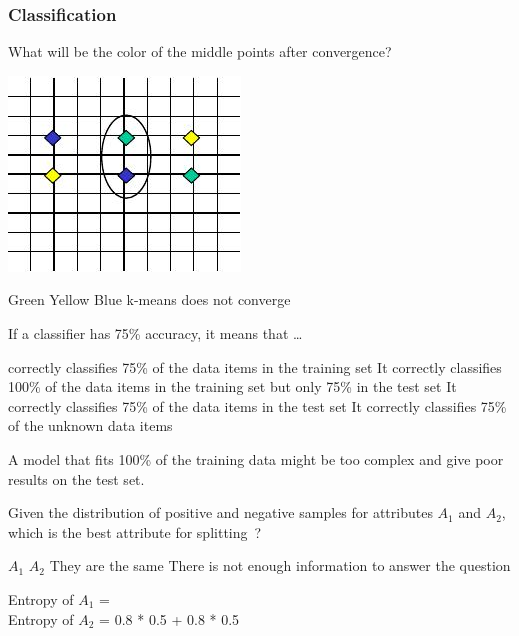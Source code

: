 \documentclass[12pt,a4paper,answers]{exam} %
\begin{document}
\begin{flushleft}
\begin{multicols*}{2}
\begin{questions}
\subsubsection{Classification}
% 
\question What will be the color of the middle points after convergence?
\begin{colfig}
\includegraphics[scale=0.3]{w11_s20}
\end{colfig}
\begin{checkboxes}
\choice Green
\choice Yellow
\choice Blue
\choice k-means does not converge
\end{checkboxes}

\question If a classifier has 75\% accuracy, it means that \ldots
\begin{checkboxes}
\choice correctly classifies 75\% of the data items in the training set
\choice It correctly classifies 100\% of the data items in the training set but only 75\% in the test set
\CorrectChoice It correctly classifies 75\% of the data items in the test set
\choice It correctly classifies 75\% of the unknown data items
\end{checkboxes}
\begin{solution}
A model that fits 100\% of the training data might be too complex and give poor results on the test set.
\end{solution}

\question Given the distribution of positive and negative samples for attributes $A_1$ and $A_2$, which is the best attribute for splitting~?
\begin{checkboxes}
\CorrectChoice $A_1$
\choice $A_2$
\choice They are the same
\choice There is not enough information to answer the question
\end{checkboxes}
\begin{solution}
Entropy of $A_1$ =  \\
Entropy of $A_2$ = 0.8 * 0.5 + 0.8 * 0.5
\end{solution}

\end{questions}
\end{multicols*}
\end{flushleft}
\end{document}
